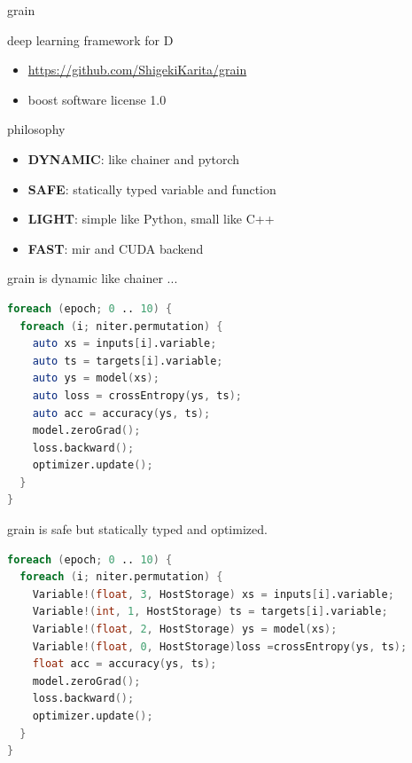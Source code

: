 \documentclass[aspectratio=169,
  14pt,xcolor=dvipsnames,table,professional font,dvipdfmx]{beamer}
\begin{document}
\begin{frame}{grain}
  \begin{alertblock}{deep learning framework for D}
    \begin{itemize}
    \item \alert{\url{https://github.com/ShigekiKarita/grain}}
    \item boost software license 1.0
    \end{itemize}
  \end{alertblock}
  \begin{exampleblock}{philosophy}
    \begin{itemize}
    \item \textbf{DYNAMIC}: like chainer and pytorch
    \item \textbf{SAFE}: statically typed variable and function
    \item \textbf{LIGHT}: simple like Python, small like C++
    \item \textbf{FAST}: mir and CUDA backend
    \end{itemize}
  \end{exampleblock}
\end{frame}

\begin{frame}[fragile]{grain is \alert{dynamic}}
like chainer ...
  \begin{lstlisting}[language=D]
foreach (epoch; 0 .. 10) {
  foreach (i; niter.permutation) {
    auto xs = inputs[i].variable;
    auto ts = targets[i].variable;
    auto ys = model(xs);
    auto loss = crossEntropy(ys, ts);
    auto acc = accuracy(ys, ts);
    model.zeroGrad();
    loss.backward();
    optimizer.update();
  }
}\end{lstlisting}
\end{frame}

\begin{frame}[fragile]{grain is \alert{safe}}
but statically typed and optimized.
  \begin{lstlisting}[language=D,basicstyle=\footnotesize\ttfamily]
foreach (epoch; 0 .. 10) {
  foreach (i; niter.permutation) {
    Variable!(float, 3, HostStorage) xs = inputs[i].variable;
    Variable!(int, 1, HostStorage) ts = targets[i].variable;
    Variable!(float, 2, HostStorage) ys = model(xs);
    Variable!(float, 0, HostStorage)loss =crossEntropy(ys, ts);
    float acc = accuracy(ys, ts);
    model.zeroGrad();
    loss.backward();
    optimizer.update();
  }
}\end{lstlisting}
\end{frame}
\end{document}

